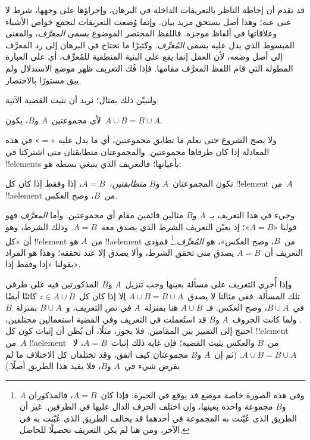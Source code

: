 \documentclass[../../../include/open-logic-section]{subfiles}
\begin{document}


قد تقدم أن إحاطة الناظر بالتعريفات الداخلة في البرهان، وإجراؤها على
وجهها، شرط لا غنى عنه؛ وهذا أصل يستحق مزيد بيان. وإنما وُضعت
التعريفات لتجمع خواص الأشياء وعلاقاتها في ألفاظ موجزة. فاللفظ المختصر
الموضوع يسمى \emph{المعرَّف}، والمعنى المبسوط الذي يدل عليه يسمى
\emph{المُعرِّف}. وكثيرًا ما نحتاج في البرهان إلى رد المعرَّف إلى أصل
وضعه، لأن العمل إنما يقع على البنية المنطقية للمُعرِّف، أي على العبارة
المطولة التي قام اللفظ المعرَّف مقامها. فإذا فُك التعريف ظهر موضع
الاستدلال ولم يبق مستورًا بالاختصار.

ولنبيّن ذلك بمثال؛ نريد أن نثبت القضية الآتية:

\begin{prop}
لأي مجموعتين~$A$ و$B$، يكون~$A \cup B = B \cup A$.
\end{prop}

ولا يصح الشروع حتى نعلم ما تطابق مجموعتين، أي ما يدل عليه «$=$» في
هذه المعادلة إذا كان طرفاها مجموعتين. والمجموعتان متطابقتان متى
اشتركتا في !!{element}s بأعيانها؛ فالتعريف الذي ينبغي بسطه هو:

\begin{defn}
تكون المجموعتان~$A$ و$B$ \emph{متطابقتين}،~$A = B$، إذا وفقط إذا كان
كل !!{element} من~$A$ !!a{element} من~$B$، وصح العكس.
\end{defn}

وجيء في هذا التعريف بـ~$A$ و$B$ مثالين قائمين مقام أي مجموعتين. وأما
\emph{المعرَّف} فهو قولنا «$A = B$»؛ إذ يعيّن التعريف الشرط الذي يصدق
معه~$A = B$. وذلك الشرط، وهو أن «كل !!{element} من~$A$ هو
!!a{element} من~$B$، وصح العكس»، هو \emph{المُعرِّف}.\footnote{وفي
هذه الصورة خاصة موضع قد يوقع في الحيرة: فإذا كان~$A = B$، فالمذكوران
$A$ و$B$ مجموعة واحدة بعينها، وإن اختلف الحرف الدال عليها في الطرفين.
غير أن الطريق الذي عُيّنت به المجموعة في أحدهما قد يخالف الطريق الذي
عُيّنت به في الآخر، ومن هنا لم يكن التعريف تحصيلًا للحاصل.} فمؤدى
التعريف أن~$A = B$ يصدق متى تحقق الشرط، وألا يصدق إلا عند تحققه؛ وهذا
هو المراد بقولنا «إذا وفقط إذا».

وإذا أُجري التعريف على مسألة بعينها وجب تنزيل~$A$ و$B$ المذكورتين فيه
على طرفي تلك المسألة. ففي مثالنا لا يصدق~$A \cup B = B \cup A$ إلا
إذا كان كل~$z \in A \cup B$ كائنًا أيضًا في~$B \cup A$، وصح العكس.
فـ~$A \cup B$ هنا بمنزلة~$A$ في نص التعريف، و~$B \cup A$ بمنزلة~$B$.
ولما كانت الحروف~$A$ و$B$ قد استُعملت في التعريف وفي القضية استعمالين
مختلفين، احتيج إلى التمييز بين المقامين. فلا يجوز، مثلًا، أن يُظن أن
إثبات كون كل !!{element} من~$A$ !!a{element} من~$B$ والعكس يثبت
القضية؛ فإن غاية ذلك إثبات~$A = B$، لا~$A \cup B = B \cup A$.
(ثم إن~$A$ و$B$ مجموعتان كيف اتفق، وقد تختلفان كل الاختلاف ما لم
يفرض شيء في~$A$ و$B$، فلا يفيد هذا الطريق أصلًا.)
\end{document}
